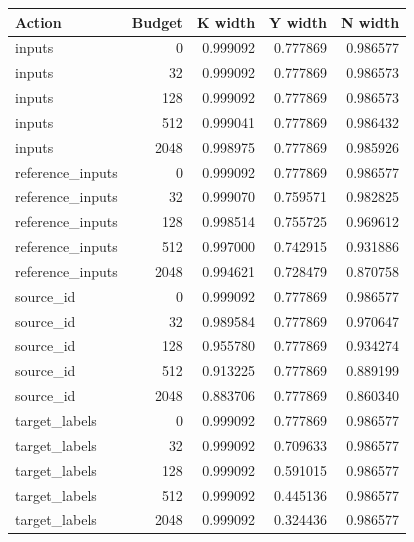 \begingroup\small
\setlength{\tabcolsep}{4pt}
\begin{longtable}{lrrrr}
\toprule

Action & Budget & K width & Y width & N width\\\midrule\endhead

inputs & 0 & 0.999092 & 0.777869 & 0.986577\\

inputs & 32 & 0.999092 & 0.777869 & 0.986573\\

inputs & 128 & 0.999092 & 0.777869 & 0.986573\\

inputs & 512 & 0.999041 & 0.777869 & 0.986432\\

inputs & 2048 & 0.998975 & 0.777869 & 0.985926\\

reference\_inputs & 0 & 0.999092 & 0.777869 & 0.986577\\

reference\_inputs & 32 & 0.999070 & 0.759571 & 0.982825\\

reference\_inputs & 128 & 0.998514 & 0.755725 & 0.969612\\

reference\_inputs & 512 & 0.997000 & 0.742915 & 0.931886\\

reference\_inputs & 2048 & 0.994621 & 0.728479 & 0.870758\\

source\_id & 0 & 0.999092 & 0.777869 & 0.986577\\

source\_id & 32 & 0.989584 & 0.777869 & 0.970647\\

source\_id & 128 & 0.955780 & 0.777869 & 0.934274\\

source\_id & 512 & 0.913225 & 0.777869 & 0.889199\\

source\_id & 2048 & 0.883706 & 0.777869 & 0.860340\\

target\_labels & 0 & 0.999092 & 0.777869 & 0.986577\\

target\_labels & 32 & 0.999092 & 0.709633 & 0.986577\\

target\_labels & 128 & 0.999092 & 0.591015 & 0.986577\\

target\_labels & 512 & 0.999092 & 0.445136 & 0.986577\\

target\_labels & 2048 & 0.999092 & 0.324436 & 0.986577\\

\bottomrule
\end{longtable}
\endgroup

